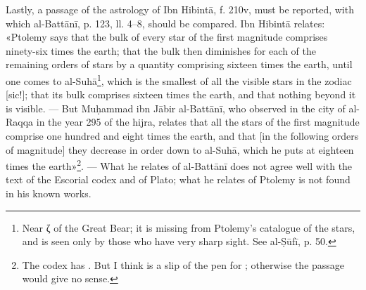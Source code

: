 \documentclass[11pt]{article}
\newcommand{\Pg}[1]{\marginpar{\footnotesize\color{gray}#1}}
\begin{document}
\par \Pg{I 289}Lastly, a passage of the astrology of Ibn Hibintā, f. 210v, must be reported, with which al-Battānī, p. 123, ll. 4–8, should be compared. Ibn Hibintā relates: «Ptolemy says that the bulk of every star of the first magnitude comprises ninety-six times the earth; that the bulk then diminishes for each of the remaining orders of stars by a quantity comprising sixteen times the earth, until one comes to al-Suhā\footnote{Near {\greekfont ζ} of the Great Bear; it is missing from Ptolemy's catalogue of the stars, and is seen only by those who have very sharp sight. See al-Ṣūfī, p. 50.}, which is the smallest of all the visible stars in the zodiac [sic!]; that its bulk comprises sixteen times the earth, and that nothing beyond it is visible. — But Muḥammad ibn Jābir al-Battānī, who observed in the city of al-Raqqa in the year 295 of the hijra, relates that all the stars of the first magnitude comprise one hundred and eight times the earth, and that [in the following orders of magnitude] they decrease in order down to al-Suhā, which he puts at eighteen times the earth»\footnote{The codex has . But I think  is a slip of the pen for ; otherwise the passage would give no sense.}. — What he relates of al-Battānī does not agree well with the text of the Escorial codex and of Plato; what he relates of Ptolemy is not found in his known works.\par
\end{document}
